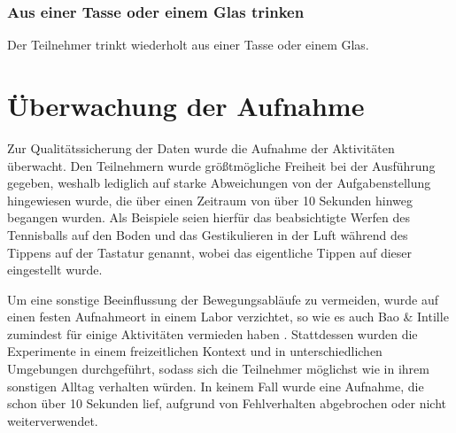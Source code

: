 \subsubsection{Aus einer Tasse oder einem Glas trinken}
Der Teilnehmer trinkt wiederholt aus einer Tasse oder einem Glas.

\section{Überwachung der Aufnahme}
Zur Qualitätssicherung der Daten wurde die Aufnahme der Aktivitäten überwacht. Den Teilnehmern wurde größtmögliche Freiheit bei der Ausführung gegeben, weshalb lediglich auf starke Abweichungen von der Aufgabenstellung hingewiesen wurde, die über einen Zeitraum von über 10 Sekunden hinweg begangen wurden. Als Beispiele seien hierfür das beabsichtigte Werfen des Tennisballs auf den Boden und das Gestikulieren in der Luft während des Tippens auf der Tastatur genannt, wobei das eigentliche Tippen auf dieser eingestellt wurde.

Um eine sonstige Beeinflussung der Bewegungsabläufe zu vermeiden, wurde auf einen festen Aufnahmeort in einem Labor verzichtet, so wie es auch Bao \& Intille zumindest für einige Aktivitäten vermieden haben \cite{Bao2004}. Stattdessen wurden die Experimente in einem freizeitlichen Kontext und in unterschiedlichen Umgebungen durchgeführt, sodass sich die Teilnehmer möglichst wie in ihrem sonstigen Alltag verhalten würden. In keinem Fall wurde eine Aufnahme, die schon über 10 Sekunden lief, aufgrund von Fehlverhalten abgebrochen oder nicht weiterverwendet.

